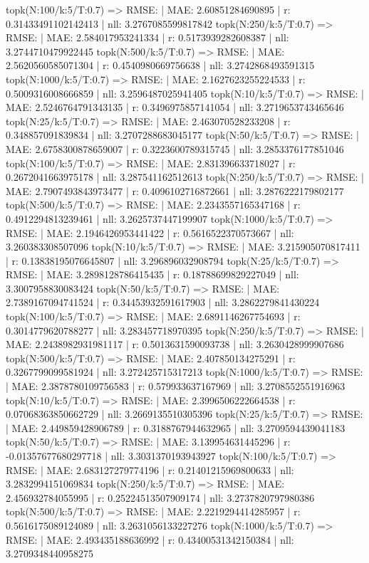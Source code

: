 topk(N:100/k:5/T:0.7) => RMSE: | MAE: 2.60851284690895 | r: 0.31433491102142413 | nll: 3.2767085599817842
topk(N:250/k:5/T:0.7) => RMSE: | MAE: 2.584017953241334 | r: 0.5173939282608387 | nll: 3.2744710479922445
topk(N:500/k:5/T:0.7) => RMSE: | MAE: 2.5620560585071304 | r: 0.4540980669756638 | nll: 3.2742868493591315
topk(N:1000/k:5/T:0.7) => RMSE: | MAE: 2.1627623255224533 | r: 0.5009316008666859 | nll: 3.2596487025941405
topk(N:10/k:5/T:0.7) => RMSE: | MAE: 2.5246764791343135 | r: 0.3496975857141054 | nll: 3.2719653743465646
topk(N:25/k:5/T:0.7) => RMSE: | MAE: 2.463070528233208 | r: 0.348857091839834 | nll: 3.2707288683045177
topk(N:50/k:5/T:0.7) => RMSE: | MAE: 2.6758300878659007 | r: 0.3223600789315745 | nll: 3.2853376177851046
topk(N:100/k:5/T:0.7) => RMSE: | MAE: 2.831396633718027 | r: 0.2672041663975178 | nll: 3.287541162512613
topk(N:250/k:5/T:0.7) => RMSE: | MAE: 2.7907493843973477 | r: 0.4096102716872661 | nll: 3.2876222179802177
topk(N:500/k:5/T:0.7) => RMSE: | MAE: 2.2343557165347168 | r: 0.4912294813239461 | nll: 3.2625737447199907
topk(N:1000/k:5/T:0.7) => RMSE: | MAE: 2.1946426953441422 | r: 0.5616522370573667 | nll: 3.260383308507096
topk(N:10/k:5/T:0.7) => RMSE: | MAE: 3.215905070817411 | r: 0.13838195076645807 | nll: 3.296896032908794
topk(N:25/k:5/T:0.7) => RMSE: | MAE: 3.2898128786415435 | r: 0.18788699829227049 | nll: 3.3007958830083424
topk(N:50/k:5/T:0.7) => RMSE: | MAE: 2.7389167094741524 | r: 0.34453932591617903 | nll: 3.2862279841430224
topk(N:100/k:5/T:0.7) => RMSE: | MAE: 2.6891146267754693 | r: 0.3014779620788277 | nll: 3.283457718970395
topk(N:250/k:5/T:0.7) => RMSE: | MAE: 2.2438982931981117 | r: 0.5013631590093738 | nll: 3.2630428999907686
topk(N:500/k:5/T:0.7) => RMSE: | MAE: 2.407850134275291 | r: 0.3267799099581924 | nll: 3.272425715317213
topk(N:1000/k:5/T:0.7) => RMSE: | MAE: 2.3878780109756583 | r: 0.579933637167969 | nll: 3.2708552551916963
topk(N:10/k:5/T:0.7) => RMSE: | MAE: 2.3996506222664538 | r: 0.07068363850662729 | nll: 3.2669135510305396
topk(N:25/k:5/T:0.7) => RMSE: | MAE: 2.449859428906789 | r: 0.3188767944632965 | nll: 3.2709594439041183
topk(N:50/k:5/T:0.7) => RMSE: | MAE: 3.139954631445296 | r: -0.01357677680297718 | nll: 3.3031370193943927
topk(N:100/k:5/T:0.7) => RMSE: | MAE: 2.683127279774196 | r: 0.21401215969800633 | nll: 3.2832994151069834
topk(N:250/k:5/T:0.7) => RMSE: | MAE: 2.456932784055995 | r: 0.25224513507909174 | nll: 3.2737820797980386
topk(N:500/k:5/T:0.7) => RMSE: | MAE: 2.2219294414285957 | r: 0.5616175089124089 | nll: 3.2631056133227276
topk(N:1000/k:5/T:0.7) => RMSE: | MAE: 2.493435188636992 | r: 0.43400531342150384 | nll: 3.2709348440958275
